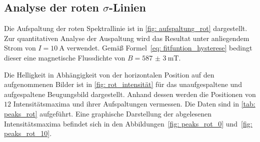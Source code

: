\subsection{Analyse der roten $\sigma$-Linien}
Die Aufspaltung der roten Spektrallinie ist in \autoref{fig: aufspaltung_rot} dargestellt. Zur quantitativen Analyse der Auspaltung wird das
Resultat unter anliegendem Strom von $I = \SI{10}{\ampere}$ verwendet. Gemäß Formel~\eqref{eq: fitfuntion_hysterese} bedingt dieser
eine magnetische Flussdichte von $B = \SI{587(3)}{\milli\tesla}$.

Die Helligkeit in Abhängigkeit von der horizontalen Position auf den aufgenommenen Bilder ist in \autoref{fig: rot_intensität} für das unaufgespaltene
und aufgespaltene Beugungsbild dargestellt. Anhand dessen werden die Positionen von $12$ Intensitätsmaxima und ihrer Aufspaltungen
vermessen. Die Daten sind in \autoref{tab: peaks_rot} aufgeführt. Eine graphische Darstellung der abgelesenen Intensitätsmaxima befindet sich in
den Abbildungen~\ref{fig: peaks_rot_0} und~\ref{fig: peaks_rot_10}.

